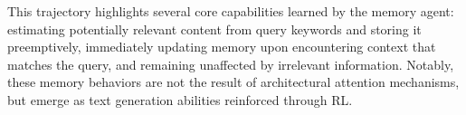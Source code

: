 



This trajectory highlights several core capabilities learned by the memory agent: estimating potentially relevant content from query keywords and storing it preemptively, immediately updating memory upon encountering context that matches the query, and remaining unaffected by irrelevant information. Notably, these memory behaviors are not the result of architectural attention mechanisms, but emerge as text generation abilities reinforced through RL.
